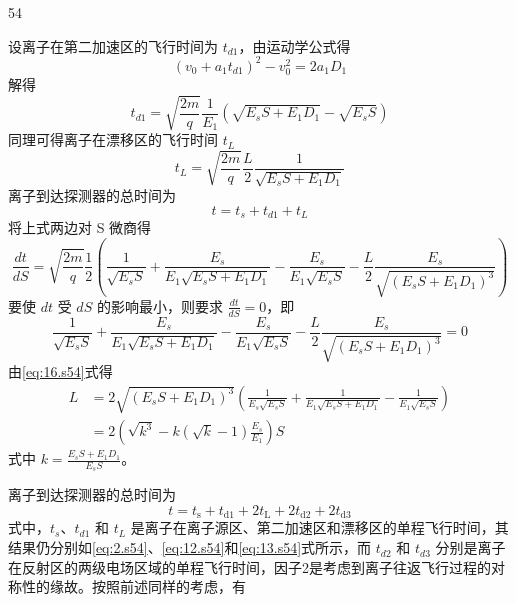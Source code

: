 \begin{solution}{54}
\begin{subsolution}
设离子在第二加速区的飞行时间为 $t_{d1}$，由运动学公式得
\begin{equation}
(v_{0} + a_{1}t_{d1})^{2} - v_{0}^{2} = 2a_{1}D_{1}
\label{eq:11.s54}
\end{equation}
解得
\begin{equation}
t_{d1} = \sqrt{\frac{2m}{q}}\frac{1}{E_{1}}\left(\sqrt{E_{s}S+E_{1}D_{1}} - \sqrt{E_{s}S}\right)
\label{eq:12.s54}
\end{equation}
同理可得离子在漂移区的飞行时间 $t_{L}$
\begin{equation}
t_{L} = \sqrt{\frac{2m}{q}}\frac{L}{2}\frac{1}{\sqrt{E_{s}S+E_{1}D_{1}}}
\label{eq:13.s54}
\end{equation}
离子到达探测器的总时间为
\begin{equation}
t = t_{s} + t_{d1} + t_{L}
\label{eq:14.s54}
\end{equation}
将上式两边对 S 微商得
\begin{equation}
\frac{dt}{dS} = \sqrt{\frac{2m}{q}}\frac{1}{2}\left(\frac{1}{\sqrt{E_{s}S}} + \frac{E_{s}}{E_{1}\sqrt{E_{s}S+E_{1}D_{1}}} - \frac{E_{s}}{E_{1}\sqrt{E_{s}S}} - \frac{L}{2}\frac{E_{s}}{\sqrt{(E_{s}S+E_{1}D_{1})^{3}}}\right)
\label{eq:15.s54}
\end{equation}
要使 $dt$ 受 $dS$ 的影响最小，则要求 $\frac{dt}{dS} = 0$，即
\begin{equation}
\frac{1}{\sqrt{E_{s}S}} + \frac{E_{s}}{E_{1}\sqrt{E_{s}S+E_{1}D_{1}}} - \frac{E_{s}}{E_{1}\sqrt{E_{s}S}} - \frac{L}{2}\frac{E_{s}}{\sqrt{(E_{s}S+E_{1}D_{1})^{3}}} = 0
\label{eq:16.s54}
\end{equation}
由\eqref{eq:16.s54}式得
\begin{equation}
\begin{array}{rl}
L &= 2\sqrt{(E_{s}S+E_{1}D_{1})^{3}}\left(\frac{1}{E_{s}\sqrt{E_{s}S}} + \frac{1}{E_{1}\sqrt{E_{s}S+E_{1}D_{1}}} - \frac{1}{E_{1}\sqrt{E_{s}S}}\right) \\
&= 2\left(\sqrt{k^{3}} - k(\sqrt{k}-1)\frac{E_{s}}{E_{1}}\right)S
\end{array}
\label{eq:17.s54}
\end{equation}
式中 $k=\frac{E_{s}S+E_{1}D_{1}}{E_{s}S}$。
\end{subsolution}
\begin{subsolution}
离子到达探测器的总时间为
\begin{equation}
t = t_{\mathrm{s}} + t_{\mathrm{d}1} + 2t_{\mathrm{L}} + 2t_{\mathrm{d}2} + 2t_{\mathrm{d}3}
\label{eq:18.s54}
\end{equation}
式中，$t_{s}$、$t_{d1}$ 和 $t_{L}$ 是离子在离子源区、第二加速区和漂移区的单程飞行时间，其结果仍分别如\eqref{eq:2.s54}、\eqref{eq:12.s54}和\eqref{eq:13.s54}式所示，而 $t_{d2}$ 和 $t_{d3}$ 分别是离子在反射区的两级电场区域的单程飞行时间，因子2是考虑到离子往返飞行过程的对称性的缘故。按照前述同样的考虑，有

\end{subsolution}
\end{solution}
